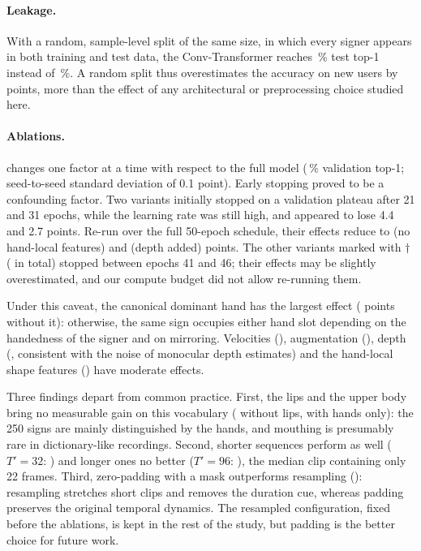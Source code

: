 \paragraph{Leakage.}
With a random, sample-level split of the same size, in which every signer appears in both training
and test data, the Conv-Transformer reaches \numLeakRandom{}\,\% test top-1 instead of
\numLeakSigner{}\,\%. A random split thus overestimates the accuracy on new users by \numLeakGap{}
points, more than the effect of any architectural or preprocessing choice studied here.

\paragraph{Ablations.}
 changes one factor at a time with respect to the full model
(\numRefValTop{}\,\% validation top-1; seed-to-seed standard deviation of 0.1 point). Early stopping
proved to be a confounding factor. Two variants initially stopped on a validation plateau after 21
and 31 epochs, while the learning rate was still high, and appeared to lose 4.4 and 2.7 points.
Re-run over the full 50-epoch schedule, their effects reduce to \numAblNoHandlocal{} (no hand-local
features) and \numAblXyz{} (depth added) points. The other variants marked with $\dagger$
(\numAblEarlyStopped{} in total) stopped between epochs 41 and 46; their effects may be slightly
overestimated, and our compute budget did not allow re-running them.

Under this caveat, the canonical dominant hand has the largest effect (\numAblNoCanonical{} points
without it): otherwise, the same sign occupies either hand slot depending on the handedness of the
signer and on mirroring. Velocities (\numAblNoVelocity{}), augmentation (\numAblNoAugment{}), depth
(\numAblXyz{}, consistent with the noise of monocular depth estimates) and the hand-local shape
features (\numAblNoHandlocal{}) have moderate effects.

Three findings depart from common practice. First, the lips and the upper body bring no
measurable gain on this vocabulary (\numAblNoLips{} without lips, \numAblHandsOnly{} with hands
only): the 250 signs are mainly distinguished by the hands, and mouthing is presumably rare in
dictionary-like recordings. Second, shorter sequences perform as well ($T'=32$: \numAblTThreeTwo{})
and longer ones no better ($T'=96$: \numAblTNineSix{}), the median clip containing only 22 frames.
Third, zero-padding with a mask outperforms resampling (\numAblPad{}): resampling stretches short
clips and removes the duration cue, whereas padding preserves the original temporal dynamics. The
resampled configuration, fixed before the ablations, is kept in the rest of the study, but padding
is the better choice for future work.


